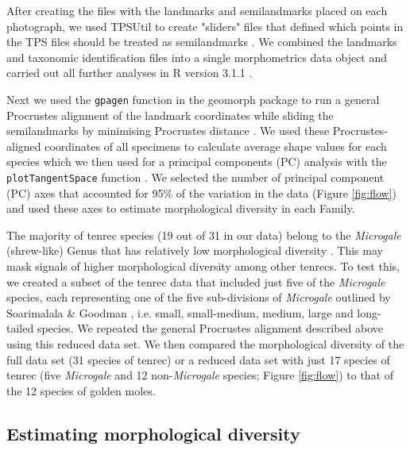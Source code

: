 \documentclass[12pt,a4paper]{article}
\begin{document}
	After creating the files with the landmarks and semilandmarks placed on each photograph, we used TPSUtil \citep{Rohlf2012} to create "sliders" files that defined which points in the TPS files should be treated as semilandmarks \citep{Zelditch2012}. We combined the landmarks and taxonomic identification files into a single morphometrics data object and carried out all further analyses in R version 3.1.1 \citep{Team2014}. 
	
	Next we used the \texttt{gpagen} function in the geomorph package \citep{Adams2013} to run a general Procrustes alignment \citep{Rohlf1993} of the landmark coordinates while sliding the semilandmarks by minimising Procrustes distance \citep{Bookstein1997}. We used these Procrustes-aligned coordinates of all specimens to calculate average shape values for each species which we then used for a principal components (PC) analysis with the \texttt{plotTangentSpace} function \citep{Adams2013}. We selected the number of principal component (PC) axes that accounted for 95\% of the variation in the data (Figure \ref{fig:flow}) and used these axes to estimate morphological diversity in each Family. 

 	The majority of tenrec species (19 out of 31 in our data) belong to the \textit{Microgale} (shrew-like) Genus that has relatively low morphological diversity \citep{Soarimalala2011, Jenkins2003}. This may mask signals of higher morphological diversity among other tenrecs. To test this, we created a subset of the tenrec data that included just five of the \textit{Microgale} species, each representing one of the five sub-divisions of \textit{Microgale} outlined by Soarimalala \& Goodman \citeyearpar{Soarimalala2011}, i.e. small, small-medium, medium, large and long-tailed species. We repeated the general Procrustes alignment described above using this reduced data set. We then compared the morphological diversity of the full data set (31 species of tenrec) or a reduced data set with just 17 species of tenrec (five \textit{Microgale} and 12 non-\textit{Microgale} species; Figure \ref{fig:flow}) to that of the 12 species of golden moles.
	
\subsection{Estimating morphological diversity}
	
\end{document}
